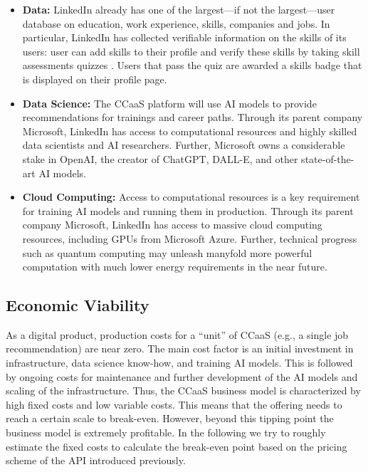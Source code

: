 \begin{itemize}
    \item \textbf{Data:} LinkedIn already has one of the largest---if not the largest---user database 
        on education, work experience, skills, companies and jobs. In particular, LinkedIn has collected
        verifiable information on the skills of its users: user can add skills to their profile and
        verify these skills by taking skill assessments quizzes \citep{kaserAIpoweredCareerCounseling2023}.
        Users that pass the quiz are awarded a skills badge that is displayed on their profile page.
    \item \textbf{Data Science:} The CCaaS platform will use AI models to provide
        recommendations for trainings and career paths. Through its parent company Microsoft,
        LinkedIn has access to computational resources and highly skilled data scientists and AI 
        researchers. Further, Microsoft owns a considerable stake in OpenAI, the creator of 
        ChatGPT, DALL-E, and other state-of-the-art AI models.
    \item \textbf{Cloud Computing:} Access to computational resources is a key requirement for training
        AI models and running them in production. Through its parent company Microsoft, LinkedIn has
        access to massive cloud computing resources, including GPUs from Microsoft Azure. Further,
        technical progress such as quantum computing may unleash manyfold more powerful computation 
        with much lower energy requirements in the near future.
\end{itemize}


\subsection{Economic Viability}

As a digital product, production costs for a ``unit'' of CCaaS (e.g., a single job recommendation) are
near zero. The main cost factor is an initial investment in infrastructure, data science know-how, and
training AI models. This is followed by ongoing costs for maintenance and further development of the AI
models and scaling of the infrastructure. Thus, the CCaaS business model is characterized by high fixed
costs and low variable costs. This means that the offering needs to reach a certain scale to break-even.
However, beyond this tipping point the business model is extremely profitable. In the following we try
to roughly estimate the fixed costs to calculate the break-even point based on the pricing scheme of the
API introduced previously.

